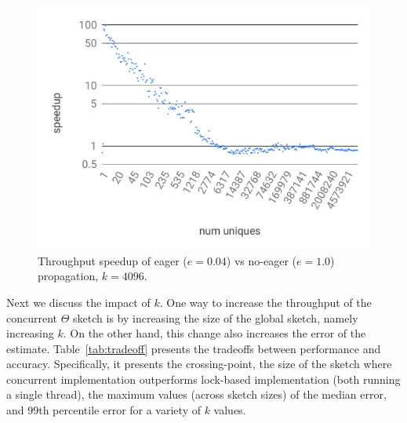 \begin{figure}[tb]
\setlength{\abovecaptionskip}{0pt}
\setlength{\belowcaptionskip}{0pt}
\setlength\textfloatsep{0pt}
	\centering
	\includegraphics[width=\columnwidth]{images/eager-speedup.pdf}
	\caption{{Throughput speedup of eager ($e=0.04$) vs no-eager ($e=1.0$) propagation, $k = 4096$.}}
	\label{fig:speedup}
\end{figure}


Next we discuss the impact of $k$.
One way to increase the throughput of the concurrent $\Theta$ sketch is by increasing the size of the global sketch, namely increasing $k$. On the other hand, this change also increases the error of the estimate.
Table~\ref{tab:tradeoff} presents the tradeoffs between performance and accuracy. Specifically, it presents the crossing-point, the size of the sketch where concurrent implementation outperforms lock-based implementation (both running a single thread), the maximum values (across sketch sizes) of the median error, and 99th percentile error for a variety of $k$ values. 

\begin{table}[htb]
\caption{{Performance vs accuracy as a function of $k$}}
\label{tab:tradeoff}
\end{table}  



